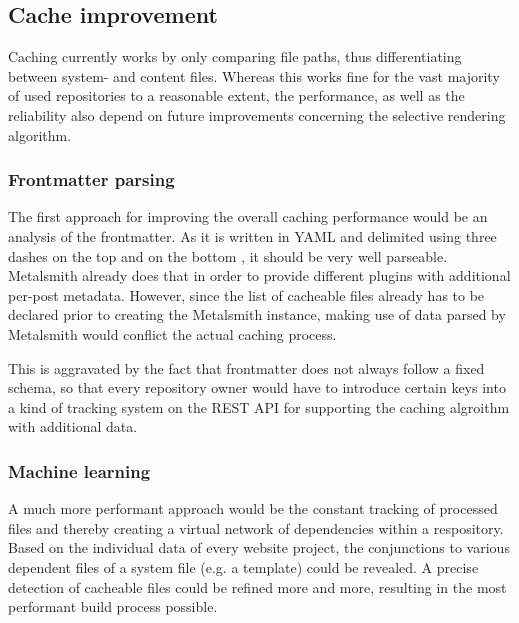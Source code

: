 \subsection{Cache improvement}
\label{sec:outlook-cacheimprovement}

Caching currently works by only comparing file paths, thus differentiating between system- and content files. Whereas this works fine for the vast majority of used repositories to a reasonable extent, the performance, as well as the reliability also depend on future improvements concerning the selective rendering algorithm.

\subsubsection{Frontmatter parsing}
The first approach for improving the overall caching performance would be an analysis of the frontmatter. As it is written in YAML and delimited using three dashes on the top and on the bottom \cite[77]{dhillon2016}, it should be very well parseable. Metalsmith already does that in order to provide different plugins with additional per-post metadata. However, since the list of cacheable files already has to be declared prior to creating the Metalsmith instance, making use of data parsed by Metalsmith would conflict the actual caching process.

This is aggravated by the fact that frontmatter does not always follow a fixed schema, so that every repository owner would have to introduce certain keys into a kind of tracking system on the REST API for supporting the caching algroithm with additional data.

\subsubsection{Machine learning}
\label{sec:chacheimprovement-machinelearning}
A much more performant approach would be the constant tracking of processed files and thereby creating a virtual network of dependencies within a respository. Based on the individual data of every website project, the conjunctions to various dependent files of a system file (e.g. a template) could be revealed. A precise detection of cacheable files could be refined more and more, resulting in the most performant build process possible.

